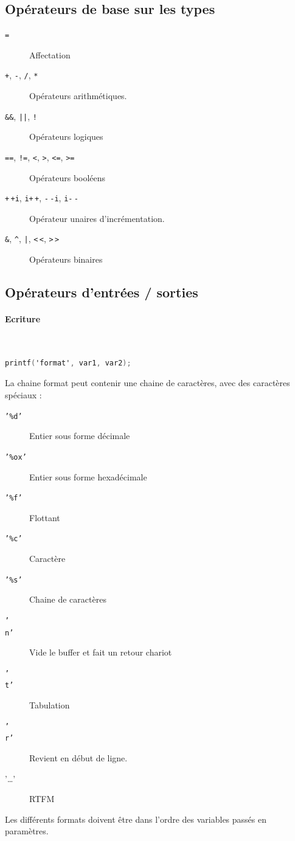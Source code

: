 \documentclass[12pt,a4paper,openany]{book}
\begin{document}
\subsection{Opérateurs de base sur les types}
\begin{description}
	\item[\texttt{=}] Affectation
	\item[\texttt{+}, \texttt{-}, \texttt{/}, \texttt{*}] Opérateurs arithmétiques.
	\item[\texttt{\&\&}, \texttt{||}, \texttt{!}] Opérateurs logiques 
	\item[\texttt{==}, \texttt{!=}, \texttt{<}, \texttt{>}, \texttt{<=}, \texttt{>=}] Opérateurs booléens
	\item[\texttt{+$\,$+i}, \texttt{i+$\,$+}, \texttt{-$\,$-i}, \texttt{i-$\,$-}] Opérateur unaires d'incrémentation.
	\item[\texttt{\&}, \texttt{\^}, \texttt{|}, \texttt{<$\,$<}, \texttt{>$\,$>}] Opérateurs binaires
\end{description}
\subsection{Opérateurs d'entrées / sorties}
\paragraph{Ecriture}~\\
\begin{lstlisting}[language=C, caption=Syntaxe de l'appel de printf]
printf('format', var1, var2);
\end{lstlisting}
La chaine format peut contenir une chaine de caractères, avec des caractères spéciaux : 
\begin{description}
	\item[\texttt{'\%d'}] Entier sous forme décimale
	\item[\texttt{'\%ox'}] Entier sous forme hexadécimale
	\item[\texttt{'\%f'}] Flottant 
	\item[\texttt{'\%c'}] Caractère 
	\item[\texttt{'\%s'}] Chaine de caractères 
	\item[\texttt{'\\n'}] Vide le buffer et fait un retour chariot 
	\item[\texttt{'\\t'}] Tabulation 
	\item[\texttt{'\\r'}] Revient en début de ligne.
	\item['\ldots'] RTFM	
\end{description}
Les différents formats doivent être dans l'ordre des variables passés en paramètres.
\end{document}

